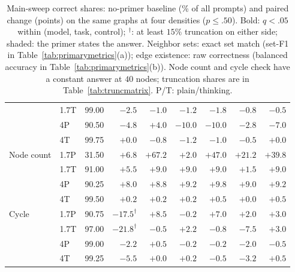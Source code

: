 \begin{table}[t]
\begin{tabular}{llrrrrrrr}
 & 1.7T & 99.00 & $-2.5$ & $-1.0$ & $-1.2$ & $-1.8$ & $-0.8$ & $-0.5$\\ %
 & 4P & 90.50 & $\mathbf{-4.8}$ & $\mathbf{+4.0}$ & $\mathbf{-10.0}$ & $\mathbf{-10.0}$ & $-2.8$ & $\mathbf{-7.0}$\\ %
 & 4T & 99.75 & $+0.0$ & $-0.8$ & $-1.2$ & $-1.0$ & $-0.5$ & $+0.0$\\ %
\midrule
Node count & 1.7P & 31.50 & $\mathbf{+6.8}$ & $\mathbf{+67.2}$ & $+2.0$ & $\mathbf{+47.0}$ & $\mathbf{+21.2}$ & $\mathbf{+39.8}$\\ %
 & 1.7T & 91.00 & $\mathbf{+5.5}$ & $\mathbf{+9.0}$ & $\mathbf{+9.0}$ & $\mathbf{+9.0}$ & $+1.5$ & $\mathbf{+9.0}$\\ %
 & 4P & 90.25 & $\mathbf{+8.0}$ & $\mathbf{+8.8}$ & $\mathbf{+9.2}$ & $\mathbf{+9.8}$ & $\mathbf{+9.0}$ & $\mathbf{+9.2}$\\ %
 & 4T & 99.50 & $+0.2$ & $+0.2$ & $+0.2$ & $+0.5$ & $+0.0$ & $+0.5$\\ %
\addlinespace[2pt]
Cycle & 1.7P & 90.75 & $\mathbf{-17.5}^{\dagger}$ & $\mathbf{+8.5}$ & $-0.2$ & $\mathbf{+7.0}$ & $+2.0$ & $+3.0$\\ %
 & 1.7T & 97.00 & $\mathbf{-21.8}^{\dagger}$ & $-0.5$ & $\mathbf{+2.2}$ & $-0.8$ & $\mathbf{-7.5}$ & $\mathbf{+3.0}$\\ %
 & 4P & 99.00 & $-2.2$ & $+0.5$ & $-0.2$ & $-0.2$ & $-2.0$ & $-0.5$\\ %
 & 4T & 99.25 & $\mathbf{-5.5}$ & $+0.0$ & $+0.2$ & $-0.5$ & $\mathbf{-3.2}$ & $+0.5$\\ %
\bottomrule
\end{tabular}
\caption{Main-sweep correct shares: no-primer baseline (\% of all prompts) and paired change (points) on the same graphs at four densities ($p\leq.50$). Bold: $q<.05$ within (model, task, control); $^{\dagger}$: at least $15\%$ truncation on either side; shaded: the primer states the answer. Neighbor sets: exact set match (set-F1 in Table~\ref{tab:primarymetrics}(a)); edge existence: raw correctness (balanced accuracy in Table~\ref{tab:primarymetrics}(b)). Node count and cycle check have a constant answer at $40$ nodes; truncation shares are in Table~\ref{tab:truncmatrix}. P/T: plain/thinking.} %
\label{tab:matrix}
\end{table}
